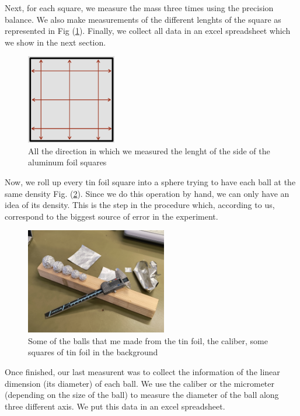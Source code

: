 \documentclass[a4paper,12pt]{article}
\begin{document}
Next, for each square, we measure the mass three times using the precision balance. We also make measurements of the different 
lenghts of the square as represented in Fig (\ref{fig:sq_measure}). Finally, we collect all data in an excel spreadsheet which we show in the next section.
\begin{figure}[h]
    \centering
    \includegraphics[width = 0.35\textwidth]{square_measure.png}
    \caption{All the direction in which we measured the lenght of the side of the aluminum foil squares}
    \label{fig:sq_measure}
\end{figure}

Now, we roll up every tin foil square into a sphere trying to have each ball at the same density Fig. (\ref{fig:tf_balls}). 
Since we do this operation by hand, we can only have an idea of its density. This is the step in the 
procedure which, according to us, correspond to the biggest source of error in the experiment.

\begin{figure}[h]
    \centering
    \includegraphics[width = 0.55\textwidth]{Tin_foil_balls.jpg}
    \caption{Some of the balls that me made from the tin foil, the caliber, some squares of tin foil in the background}
    \label{fig:tf_balls}
\end{figure}

Once finished, our last measurent was to collect the information of the linear dimension (its diameter) 
of each ball. We use the caliber or the micrometer (depending on the size of the ball) to measure the diameter 
of the ball along three different axis. We put this data in an excel spreadsheet.
\end{document}
